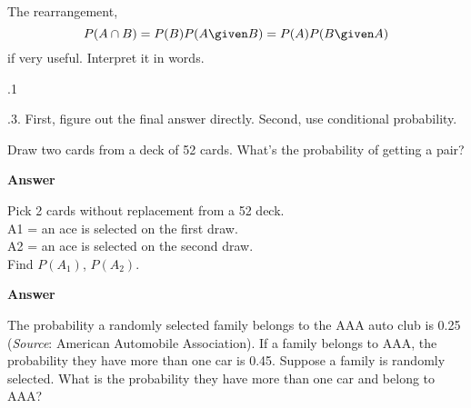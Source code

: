 \documentclass[12pt]{article}
\begin{document}
The rearrangement,
\[
P(A \cap B) = P(B) P(A \given B) = P(A) P(B \given A)
\]
if very useful.
Interpret it in words.

.1

.3.
First, figure out the final answer directly.
Second, use conditional probability.

\example
Draw two cards from a deck of 52 cards.
What's the probability of getting a pair?

\textbf{Answer}


\example Pick 2 cards without replacement from a 52 deck.\\
A1 = an ace is selected on the first draw.\\
A2 = an ace is selected on the second draw.\\
Find $P(A_1)$, $P(A_2)$.

\textbf{Answer}


\example
The probability a randomly selected family belongs to the AAA auto club
is 0.25 (\textit{Source}: American Automobile Association). If a family
belongs to AAA, the probability they have more than one car is 0.45.
Suppose a family is randomly selected.
What is the probability they have more than one car and belong to AAA?
\end{document}
